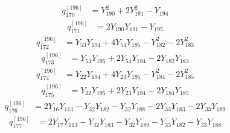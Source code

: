 \begin{equation}\label{q196:row:170}
\begin{aligned}
q_{170}^{[196]} &={} Y_{190}^{2} + 2Y_{191}^{2} - Y_{194}
\end{aligned}
\end{equation}
\begin{equation}\label{q196:row:171}
\begin{aligned}
q_{171}^{[196]} &={} 2Y_{190}Y_{191} - Y_{195}
\end{aligned}
\end{equation}
\begin{equation}\label{q196:row:172}
\begin{aligned}
q_{172}^{[196]} &={} Y_{53}Y_{194} + 4Y_{54}Y_{195} - Y_{182}^{2} - 2Y_{183}^{2}
\end{aligned}
\end{equation}
\begin{equation}\label{q196:row:173}
\begin{aligned}
q_{173}^{[196]} &={} Y_{53}Y_{195} + 2Y_{54}Y_{194} - 2Y_{182}Y_{183}
\end{aligned}
\end{equation}
\begin{equation}\label{q196:row:174}
\begin{aligned}
q_{174}^{[196]} &={} Y_{22}Y_{194} + 4Y_{23}Y_{195} - Y_{184}^{2} - 2Y_{185}^{2}
\end{aligned}
\end{equation}
\begin{equation}\label{q196:row:175}
\begin{aligned}
q_{175}^{[196]} &={} Y_{22}Y_{195} + 2Y_{23}Y_{194} - 2Y_{184}Y_{185}
\end{aligned}
\end{equation}
\begin{equation}\label{q196:row:176}
\begin{aligned}
q_{176}^{[196]} &={} 2Y_{16}Y_{113} - Y_{32}Y_{182} - Y_{32}Y_{188} - 2Y_{33}Y_{183} - 2Y_{33}Y_{189}
\end{aligned}
\end{equation}
\begin{equation}\label{q196:row:177}
\begin{aligned}
q_{177}^{[196]} &={} 2Y_{17}Y_{113} - Y_{32}Y_{183} - Y_{32}Y_{189} - Y_{33}Y_{182} - Y_{33}Y_{188}
\end{aligned}
\end{equation}
